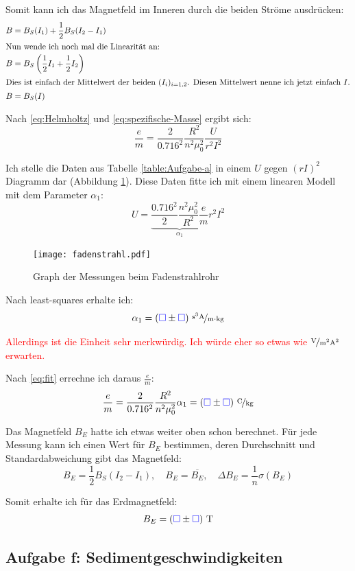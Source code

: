 \documentclass[11pt]{article}
\newcommand{\emesswert}{\left(\messwert \pm \messwert \right)}
\newcommand{\half}{\frac{1}{2}}
\newcommand{\messwert}{\textcolor{blue}{\square}}
\begin{document}
Somit kann ich das Magnetfeld im Inneren durch die beiden Ströme ausdrücken:
\begin{align*}
	B &= B_S(I_1) + \half B_S(I_2 - I_1) \\
	\intertext{Nun wende ich noch mal die Linearität an:}
	B &= B_S \left( \half I_1 + \half I_2 \right) \\
	\intertext{Dies ist einfach der Mittelwert der beiden $(I_i)_{i = 1,2}$.
	Diesen Mittelwert nenne ich jetzt einfach $I$.}
	B &= B_S(I)
\end{align*}

Nach \eqref{eq:Helmholtz} und \eqref{eq:spezifische-Masse} ergibt sich:
\begin{equation}
	\label{eq:fit}
	\frac em = \frac{2}{0.716^2} \frac{R^2}{n^2 \mu_0^2} \frac{U}{r^2 I^2}
\end{equation}

Ich stelle die Daten aus Tabelle \ref{table:Aufgabe-a} in einem $U$ gegen
$(rI)^2$ Diagramm dar (Abbildung \ref{fig:graph-fadenstrahlrohr}). Diese Daten
fitte ich mit einem linearen Modell mit dem Parameter $\alpha_1$:
\[ U = \underbrace{\frac{0.716^2}{2} \frac{n^2 \mu_0^2}{R^2} \frac em}_{\alpha_1} r^2 I^2 \]

\begin{figure}[h!]
	\centering
	\texttt{[image: fadenstrahl.pdf]}
	\caption{Graph der Messungen beim Fadenstrahlrohr}
	\label{fig:graph-fadenstrahlrohr}
\end{figure}

Nach least-squares erhalte ich:
\[ \alpha_1 = \unitfrac[\emesswert]{s^3 A}{m \cdot kg} \]

\textcolor{red}{Allerdings ist die Einheit sehr merkwürdig. Ich würde eher so
etwas wie $\unitfrac{V}{m^2 A^2}$ erwarten.}

Nach \eqref{eq:fit} errechne ich daraus $\frac em$:
\[
	\frac em
	= \frac{2}{0.716^2} \frac{R^2}{n^2 \mu_0^2} \alpha_1
	= \unitfrac[\emesswert] C{kg}
\]

Das Magnetfeld $B_E$ hatte ich etwas weiter oben schon berechnet. Für jede
Messung kann ich einen Wert für $B_E$ bestimmen, deren Durchschnitt und
Standardabweichung gibt das Magnetfeld:
\[
	B_E = \half B_S(I_2 - I_1)
	, \quad
	B_E = \overline{B_E}
	, \quad
	\Delta B_E = \frac 1n \sigma(B_E)
\]

Somit erhalte ich für das Erdmagnetfeld:
\[ B_E = \unit[\emesswert] T \]

\subsection{Aufgabe f: Sedimentgeschwindigkeiten}
\end{document}

